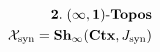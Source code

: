 \documentclass[preview]{standalone}
\begin{document}
\begin{align*}
\special{dvisvgm:raw <g id='unique000'>}\mathbf{2.\;(\infty,1)\text{-}Topos}\\\mathcal{X}_{\text{syn}}=\mathbf{Sh}_\infty(\mathbf{Ctx}, J_{\text{syn}})\special{dvisvgm:raw </g>}
\end{align*}
\end{document}
